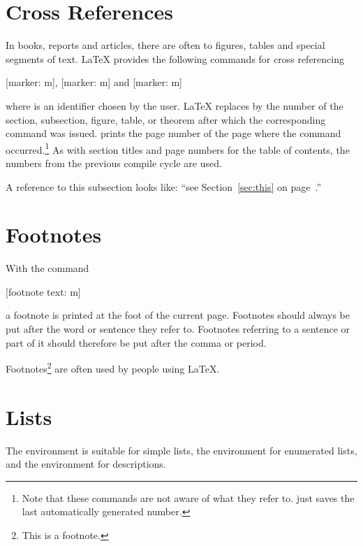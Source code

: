 \section{Cross References}\label{sec:crossref}

In books, reports and articles, there are often
 to figures, tables and special segments of text.
\LaTeX{} provides the following commands for cross referencing
\begin{lscommand}
  [marker: m], [marker: m]
  and [marker: m]
\end{lscommand}
where  is an identifier chosen by the user. \LaTeX{} replaces
 by the number of the section, subsection, figure, table, or theorem
after which the corresponding  command was issued. 
prints the page number of the page where the  command
occurred.\footnote{Note that these commands are not aware of what they refer
  to.  just saves the last automatically generated number.} As with
section titles and page numbers for the table of contents, the numbers from the
previous compile cycle are used.

\begin{example}[examplewidth=0.4\textwidth]
A reference to this subsection%
\label{sec:this} looks like:
\enquote{see Section~\ref{sec:this}
on page~\pageref{sec:this}.}
\end{example}

\section{Footnotes}
With the command
\begin{lscommand}
  [footnote text: m]
\end{lscommand}
a footnote is printed at the foot of the current page.  Footnotes should always
be put after the word or sentence they refer to. Footnotes referring to a
sentence or part of it should therefore be put after the comma or period.

\begin{example}
Footnotes\footnote{This is
  a footnote.} are often used
by people using \LaTeX.
\end{example}

\section{Lists}

The  environment is suitable for simple lists, the
 environment for enumerated lists, and the
 environment for descriptions.

